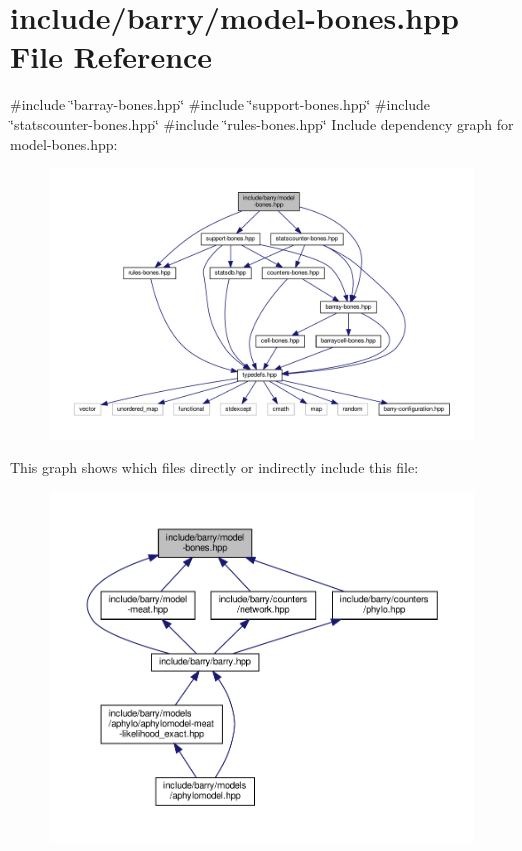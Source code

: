 \hypertarget{model-bones_8hpp}{}\section{include/barry/model-\/bones.hpp File Reference}
\label{model-bones_8hpp}
{\ttfamily \#include \char`\"{}barray-\/bones.\+hpp\char`\"{}}\newline
{\ttfamily \#include \char`\"{}support-\/bones.\+hpp\char`\"{}}\newline
{\ttfamily \#include \char`\"{}statscounter-\/bones.\+hpp\char`\"{}}\newline
{\ttfamily \#include \char`\"{}rules-\/bones.\+hpp\char`\"{}}\newline
Include dependency graph for model-\/bones.hpp\+:\nopagebreak
\begin{figure}[H]
\begin{center}
\leavevmode
\includegraphics[width=350pt]{model-bones_8hpp__incl}
\end{center}
\end{figure}
This graph shows which files directly or indirectly include this file\+:
\nopagebreak
\begin{figure}[H]
\begin{center}
\leavevmode
\includegraphics[width=350pt]{model-bones_8hpp__dep__incl}
\end{center}
\end{figure}

